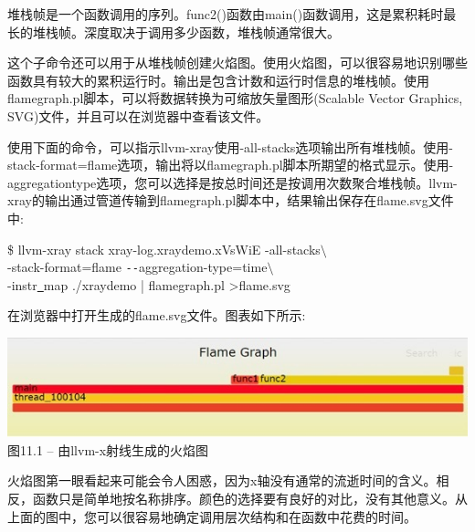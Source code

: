 堆栈帧是一个函数调用的序列。func2()函数由main()函数调用，这是累积耗时最长的堆栈帧。深度取决于调用多少函数，堆栈帧通常很大。\par

这个子命令还可以用于从堆栈帧创建火焰图。使用火焰图，可以很容易地识别哪些函数具有较大的累积运行时。输出是包含计数和运行时信息的堆栈帧。使用flamegraph.pl脚本，可以将数据转换为可缩放矢量图形(Scalable Vector Graphics, SVG)文件，并且可以在浏览器中查看该文件。\par

使用下面的命令，可以指示llvm-xray使用-all-stacks选项输出所有堆栈帧。使用-stack-format=\allowbreak flame选项，输出将以flamegraph.pl脚本所期望的格式显示。使用-aggregationtype选项，您可以选择是按总时间还是按调用次数聚合堆栈帧。llvm-xray的输出通过管道传输到flamegraph.pl脚本中，结果输出保存在flame.svg文件中:\par

\begin{tcolorbox}[colback=white,colframe=black]
\$ llvm-xray stack xray-log.xraydemo.xVsWiE -all-stacks$\setminus$ \\
\hspace*{0.5cm}-stack-format=flame \verb|--|aggregation-type=time$\setminus$ \\
\hspace*{0.5cm}-instr\underline{~}map ./xraydemo | flamegraph.pl >flame.svg
\end{tcolorbox}

在浏览器中打开生成的flame.svg文件。图表如下所示:\par

\hspace*{\fill} \par %
\begin{center}
\includegraphics[width=1\textwidth]{content/3/chapter11/images/1.jpg}\\
图11.1 – 由llvm-x射线生成的火焰图
\end{center}

火焰图第一眼看起来可能会令人困惑，因为x轴没有通常的流逝时间的含义。相反，函数只是简单地按名称排序。颜色的选择要有良好的对比，没有其他意义。从上面的图中，您可以很容易地确定调用层次结构和在函数中花费的时间。\par

